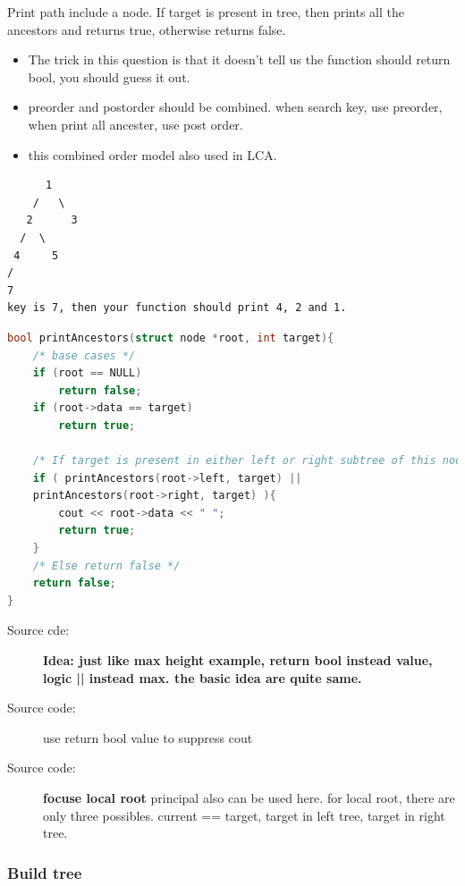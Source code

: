 \documentclass[a4paper,11pt,twoside]{book}
\begin{document}
	\par Print path include a node. If target is present in tree, then prints all the ancestors and returns true, otherwise returns false. 
	
\begin{itemize}
	\item The trick in this question is that it doesn't tell us the function should return bool, you should guess it out.
	
	\item preorder and postorder should be combined. when search key, use preorder, when print all ancester, use post order. 
	
	\item this combined order model also used in LCA.
\end{itemize}
\begin{verbatim}
      1
    /   \
   2      3
  /  \
 4     5
/
7
key is 7, then your function should print 4, 2 and 1.
\end{verbatim}

\begin{lstlisting}[frame=single, language=c++]
bool printAncestors(struct node *root, int target){
	/* base cases */
	if (root == NULL)
		return false;
	if (root->data == target)
		return true;
	
	/* If target is present in either left or right subtree of this node, then print this node */
	if ( printAncestors(root->left, target) ||
	printAncestors(root->right, target) ){
		cout << root->data << " ";
		return true;
	}
	/* Else return false */
	return false;
}	
\end{lstlisting}
\begin{description}
	\item[Source cde:] \textbf{Idea: just like max height example, return bool instead value, logic || instead max. the basic idea are quite same. }
	
	\item[Source code:] use return bool value to suppress cout
	
	\item[Source code:] \textbf{focuse local root} principal also can be used here. for local root, there are only three possibles.  current == target,  target in left tree, target in right tree.    
\end{description}

\subsubsection{Build tree}
	
\end{document}
